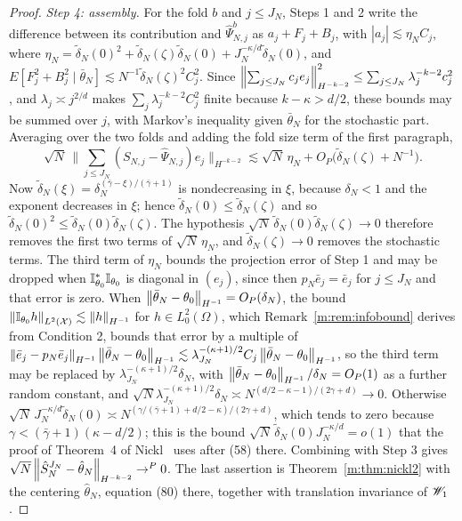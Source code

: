 \begin{proof}
\emph{Step 4: assembly.} For the fold $b$ and $j\le J_N$, Steps 1 and 2 write the difference between its contribution and $\hat\Psi^b_{N,j}$ as $a_j+F_j+B_j$, with $|a_j|\lesssim\eta_NC_j$, where $\eta_N=\tilde\delta_N(0)^2+\tilde\delta_N(\zeta)\tilde\delta_N(0)+J_N^{-\kappa/d}\tilde\delta_N(0)$, and $E[F_j^2+B_j^2\mid\bar\theta_N]\lesssim N^{-1}\tilde\delta_N(\zeta)^2C_j^2$. Since $\left\|\sum_{j\le J_N}c_je_j\right\|^2_{H^{-k-2}}\le\sum_{j\le J_N}\lambda_j^{-k-2}c_j^2$, and $\lambda_j\asymp j^{2/d}$ makes $\sum_j\lambda_j^{-k-2}C_j^2$ finite because $k-\kappa>d/2$, these bounds may be summed over $j$, with Markov's inequality given $\bar\theta_N$ for the stochastic part. Averaging over the two folds and adding the fold size term of the first paragraph,
\[
\sqrt N\,\Big\|\sum_{j\le J_N}(S_{N,j}-\hat\Psi_{N,j})e_j\Big\|_{H^{-k-2}}\lesssim\sqrt N\,\eta_N+O_P\big(\tilde\delta_N(\zeta)+N^{-1}\big).
\]
Now $\tilde\delta_N(\xi)=\delta_N^{(\bar\gamma-\xi)/(\bar\gamma+1)}$ is nondecreasing in $\xi$, because $\delta_N<1$ and the exponent decreases in $\xi$; hence $\tilde\delta_N(0)\le\tilde\delta_N(\zeta)$ and so $\tilde\delta_N(0)^2\le\tilde\delta_N(0)\tilde\delta_N(\zeta)$. The hypothesis $\sqrt N\,\tilde\delta_N(0)\tilde\delta_N(\zeta)\to0$ therefore removes the first two terms of $\sqrt N\,\eta_N$, and $\tilde\delta_N(\zeta)\to0$ removes the stochastic terms. The third term of $\eta_N$ bounds the projection error of Step 1 and may be dropped when $\mathbb{I}^*_{\theta_0}\mathbb{I}_{\theta_0}$ is diagonal in $(e_j)$, since then $p_N\bar e_j=\bar e_j$ for $j\le J_N$ and that error is zero. When $\left\|\bar\theta_N-\theta_0\right\|_{H^{-1}}=O_P(\delta_N)$, the bound $\left\|\mathbb{I}_{\theta_0}h\right\|_{L^2(\mathcal X)}\lesssim\left\|h\right\|_{H^{-1}}$ for $h\in L^2_0(\Omega)$, which Remark~\ref{m:rem:infobound} derives from Condition 2, bounds that error by a multiple of $\left\|\bar e_j-p_N\bar e_j\right\|_{H^{-1}}\left\|\bar\theta_N-\theta_0\right\|_{H^{-1}}\lesssim\lambda_{J_N}^{-(\kappa+1)/2}C_j\left\|\bar\theta_N-\theta_0\right\|_{H^{-1}}$, so the third term may be replaced by $\lambda_{J_N}^{-(\kappa+1)/2}\delta_N$, with $\left\|\bar\theta_N-\theta_0\right\|_{H^{-1}}/\delta_N=O_P(1)$ as a further random constant, and $\sqrt N\lambda_{J_N}^{-(\kappa+1)/2}\delta_N\asymp N^{(d/2-\kappa-1)/(2\gamma+d)}\to0$. Otherwise $\sqrt N\,J_N^{-\kappa/d}\tilde\delta_N(0)\asymp N^{(\gamma/(\bar\gamma+1)+d/2-\kappa)/(2\gamma+d)}$, which tends to zero because $\gamma<(\bar\gamma+1)(\kappa-d/2)$; this is the bound $\sqrt N\,\tilde\delta_N(0)J_N^{-\kappa/d}=o(1)$ that the proof of Theorem~4 of Nickl~\cite{nicklbvm2024} uses after (58) there. Combining with Step 3 gives $\sqrt N\left\|\hat S^{J_N}_N-\hat\theta_N\right\|_{H^{-k-2}}\to^P0$. The last assertion is Theorem~\ref{m:thm:nickl2} with the centering $\hat\theta_N$, equation (80) there, together with translation invariance of $\mathscr{W}_1$.
\end{proof}

